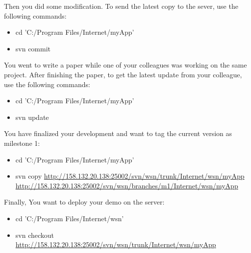 Then you did some modification. To send the latest copy to the sever, use the following commands:
\begin{itemize}
\item cd 'C:/Program Files/Internet/myApp'
\item svn commit
\end{itemize}

You went to write a paper while one of your colleagues was working on the same project. After finishing the paper, to get the latest update from your colleague, use the following commands:
\begin{itemize}
\item cd 'C:/Program Files/Internet/myApp'
\item svn update
\end{itemize}

You have finalized your development and want to tag the current version as milestone 1:
\begin{itemize}
\item cd 'C:/Program Files/Internet/myApp'
\item svn copy \url{http://158.132.20.138:25002/svn/wsn/trunk/Internet/wsn/myApp} \url{http://158.132.20.138:25002/svn/wsn/branches/m1/Internet/wsn/myApp}
\end{itemize}

Finally, You want to deploy your demo on the server:
\begin{itemize}
\item cd 'C:/Program Files/Internet/wsn'
\item svn checkout \url{http://158.132.20.138:25002/svn/wsn/trunk/Internet/wsn/myApp}
\end{itemize}